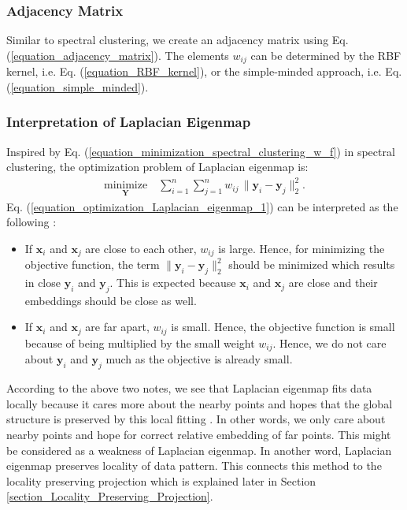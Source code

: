 \documentclass[lang=cn,10pt]{gorgeousnbook}
\numberwithin{equation}{section}%
\numberwithin{figure}{section}%
\begin{document}
\subsubsection{Adjacency Matrix}

Similar to spectral clustering, we create an adjacency matrix using Eq. (\ref{equation_adjacency_matrix}). The elements $w_{ij}$ can be determined by the RBF kernel, i.e. Eq. (\ref{equation_RBF_kernel}), or the simple-minded approach, i.e. Eq. (\ref{equation_simple_minded}).

\subsubsection{Interpretation of Laplacian Eigenmap}\label{section_LE_interpretation}

Inspired by Eq. (\ref{equation_minimization_spectral_clustering_w_f}) in spectral clustering, the optimization problem of Laplacian eigenmap is:
\begin{align}\label{equation_optimization_Laplacian_eigenmap_1}
\underset{\boldsymbol{Y}}{\text{minimize}} \quad \sum_{i=1}^n \sum_{j=1}^n w_{ij}\, \|\boldsymbol{y}_i - \boldsymbol{y}_j\|_2^2.
\end{align}
Eq. (\ref{equation_optimization_Laplacian_eigenmap_1}) can be interpreted as the following \cite{belkin2003laplacian}:
\begin{itemize}
\item If $\boldsymbol{x}_i$ and $\boldsymbol{x}_j$ are close to each other, $w_{ij}$ is large. Hence, for minimizing the objective function, the term $\|\boldsymbol{y}_i - \boldsymbol{y}_j\|_2^2$ should be minimized which results in close $\boldsymbol{y}_i$ and $\boldsymbol{y}_j$. This is expected because $\boldsymbol{x}_i$ and $\boldsymbol{x}_j$ are close and their embeddings should be close as well. 
\item If $\boldsymbol{x}_i$ and $\boldsymbol{x}_j$ are far apart, $w_{ij}$ is small. Hence, the objective function is small because of being multiplied by the small weight $w_{ij}$. Hence, we do not care about $\boldsymbol{y}_i$ and $\boldsymbol{y}_j$ much as the objective is already small. 
\end{itemize}
According to the above two notes, we see that Laplacian eigenmap fits data locally because it cares more about the nearby points and hopes that the global structure is preserved by this local fitting \cite{saul2003think}. In other words, we only care about nearby points and hope for correct relative embedding of far points. This might be considered as a weakness of Laplacian eigenmap. In another word, Laplacian eigenmap preserves locality of data pattern. This connects this method to the locality preserving projection which is explained later in Section \ref{section_Locality_Preserving_Projection}. 
\end{document}
